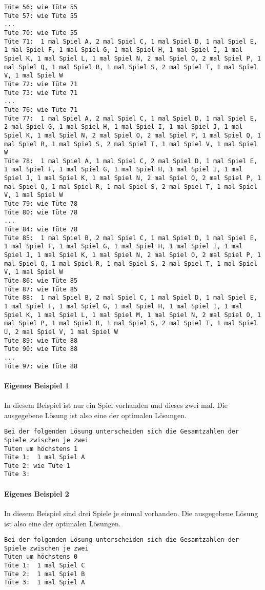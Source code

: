 \documentclass[a4paper,10pt,ngerman]{scrartcl}
\begin{document}
\begin{lstlisting}[frame=tb,breaklines=true]
Tüte 56: wie Tüte 55
Tüte 57: wie Tüte 55
...
Tüte 70: wie Tüte 55
Tüte 71:  1 mal Spiel A, 2 mal Spiel C, 1 mal Spiel D, 1 mal Spiel E, 1 mal Spiel F, 1 mal Spiel G, 1 mal Spiel H, 1 mal Spiel I, 1 mal Spiel K, 1 mal Spiel L, 1 mal Spiel N, 2 mal Spiel O, 2 mal Spiel P, 1 mal Spiel Q, 1 mal Spiel R, 1 mal Spiel S, 2 mal Spiel T, 1 mal Spiel V, 1 mal Spiel W
Tüte 72: wie Tüte 71
Tüte 73: wie Tüte 71
...
Tüte 76: wie Tüte 71
Tüte 77:  1 mal Spiel A, 2 mal Spiel C, 1 mal Spiel D, 1 mal Spiel E, 2 mal Spiel G, 1 mal Spiel H, 1 mal Spiel I, 1 mal Spiel J, 1 mal Spiel K, 1 mal Spiel N, 2 mal Spiel O, 2 mal Spiel P, 1 mal Spiel Q, 1 mal Spiel R, 1 mal Spiel S, 2 mal Spiel T, 1 mal Spiel V, 1 mal Spiel W
Tüte 78:  1 mal Spiel A, 1 mal Spiel C, 2 mal Spiel D, 1 mal Spiel E, 1 mal Spiel F, 1 mal Spiel G, 1 mal Spiel H, 1 mal Spiel I, 1 mal Spiel J, 1 mal Spiel K, 1 mal Spiel N, 2 mal Spiel O, 2 mal Spiel P, 1 mal Spiel Q, 1 mal Spiel R, 1 mal Spiel S, 2 mal Spiel T, 1 mal Spiel V, 1 mal Spiel W
Tüte 79: wie Tüte 78
Tüte 80: wie Tüte 78
...
Tüte 84: wie Tüte 78
Tüte 85:  1 mal Spiel B, 2 mal Spiel C, 1 mal Spiel D, 1 mal Spiel E, 1 mal Spiel F, 1 mal Spiel G, 1 mal Spiel H, 1 mal Spiel I, 1 mal Spiel J, 1 mal Spiel K, 1 mal Spiel N, 2 mal Spiel O, 2 mal Spiel P, 1 mal Spiel Q, 1 mal Spiel R, 1 mal Spiel S, 2 mal Spiel T, 1 mal Spiel V, 1 mal Spiel W
Tüte 86: wie Tüte 85
Tüte 87: wie Tüte 85
Tüte 88:  1 mal Spiel B, 2 mal Spiel C, 1 mal Spiel D, 1 mal Spiel E, 1 mal Spiel F, 1 mal Spiel G, 1 mal Spiel H, 1 mal Spiel I, 1 mal Spiel K, 1 mal Spiel L, 1 mal Spiel M, 1 mal Spiel N, 2 mal Spiel O, 1 mal Spiel P, 1 mal Spiel R, 1 mal Spiel S, 2 mal Spiel T, 1 mal Spiel U, 2 mal Spiel V, 1 mal Spiel W
Tüte 89: wie Tüte 88
Tüte 90: wie Tüte 88
...
Tüte 97: wie Tüte 88
\end{lstlisting}

\paragraph{Eigenes Beispiel 1}
In diesem Beispiel ist nur ein Spiel vorhanden und dieses zwei mal. Die ausgegebene Lösung ist also eine der optimalen Lösungen.
\begin{lstlisting}[frame=tb]
Bei der folgenden Lösung unterscheiden sich die Gesamtzahlen der Spiele zwischen je zwei
Tüten um höchstens 1
Tüte 1:  1 mal Spiel A
Tüte 2: wie Tüte 1
Tüte 3:
\end{lstlisting}

\paragraph{Eigenes Beispiel 2}
In diesem Beispiel sind drei Spiele je einmal vorhanden. Die ausgegebene Lösung ist also eine der optimalen Lösungen.
\begin{lstlisting}[frame=tb]
Bei der folgenden Lösung unterscheiden sich die Gesamtzahlen der Spiele zwischen je zwei
Tüten um höchstens 0
Tüte 1:  1 mal Spiel C
Tüte 2:  1 mal Spiel B
Tüte 3:  1 mal Spiel A
\end{lstlisting}
\end{document}
